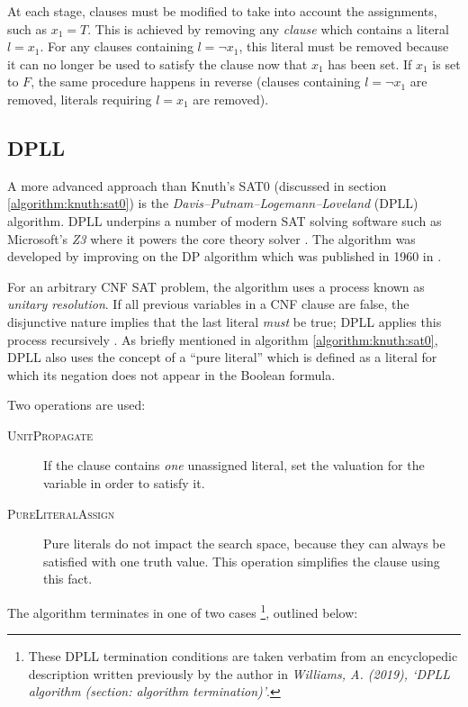 \documentclass[a4paper,openany,12pt]{book}
\begin{document}
At each stage, clauses must be modified to take into account the assignments, such as $x_1 = T$.
This is achieved by removing any \emph{clause} which contains a literal $l = x_1$.
For any clauses containing $l = \neg x_1$, this literal must be removed because it can no longer be used to satisfy the
clause now that $x_1$ has been set. If $x_1$ is set to $F$, the same procedure happens in reverse (clauses containing $l
= \neg x_1$ are removed, literals requiring $l = x_1$ are removed).

\label{algorithm:knuth:sat0}

\subsection{DPLL}

A more advanced approach than Knuth's SAT0 (discussed in section \ref{algorithm:knuth:sat0}) is the
\emph{Davis–Putnam–Logemann–Loveland} (DPLL) algorithm.
DPLL underpins a number of modern SAT solving software such as Microsoft's \emph{Z3} where it powers the core theory
solver \citep{de2008z3}.
The algorithm was developed by improving on the DP algorithm which was published in 1960 in
\citet{Davis:1960:CPQ:321033.321034}.

For an arbitrary CNF SAT problem, the algorithm uses a process known as \emph{unitary resolution}.
If all previous variables in a CNF clause are false, the disjunctive nature implies that the last literal \emph{must} be
true; DPLL applies this process recursively \citep{russell2016artificial}.
As briefly mentioned in algorithm \ref{algorithm:knuth:sat0}, DPLL also uses the concept of a ``pure literal'' which is
defined as a literal for which its negation does not appear in the Boolean formula.

Two operations are used:

\begin{description}
    \item[\textsc{UnitPropagate}] If the clause contains \emph{one} unassigned literal,
                                  set the valuation for the variable in order to satisfy it.
    \item[\textsc{PureLiteralAssign}] Pure literals do not impact the search space, because they can always be satisfied
                                      with one truth value.
                                      This operation simplifies the clause using this fact.
\end{description}

The algorithm terminates in one of two cases \footnote{%
    These DPLL termination conditions are taken verbatim from an encyclopedic description written previously by the
    author in \emph{Williams, A. (2019), `DPLL algorithm (section: algorithm termination)'}.
}, outlined below:
\end{document}
